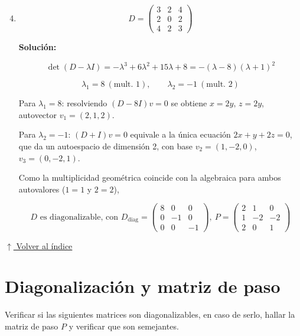 \documentclass[12pt]{article}
\newcommand{\solucion}{%
    \vspace{0.8em}%
    \textbf{Solución:}%
    \vspace{0.8em}%
}
\newcommand{\volverindice}{%
    \vspace{1em}%
    \begin{flushright}%
        \hyperlink{indice}{\small $\uparrow$ Volver al índice}%
    \end{flushright}%
}
\begin{document}
\begin{enumerate}[label=\alph*.-]
    \setcounter{enumi}{3}

    \item
    \[
    D=\begin{pmatrix}3&2&4\\2&0&2\\4&2&3\end{pmatrix}
    \]

    \solucion

    \[
    \det(D-\lambda I)=-\lambda^3+6\lambda^2+15\lambda+8
    =-(\lambda-8)(\lambda+1)^2
    \]

    \[
    \boxed{\lambda_1=8 \ (\text{mult. } 1), \qquad \lambda_2=-1\ (\text{mult. } 2)}
    \]

    Para $\lambda_1=8$: resolviendo $(D-8I)v=0$ se obtiene
    $x=2y,\, z=2y$, autovector $v_1=(2,1,2)$.

    Para $\lambda_2=-1$: $(D+I)v=0$ equivale a la única ecuación
    $2x+y+2z=0$, que da un autoespacio de dimensión 2, con base
    $v_2=(1,-2,0)$, $v_3=(0,-2,1)$.

    Como la multiplicidad geométrica coincide con la algebraica para
    ambos autovalores ($1=1$ y $2=2$),

    \[
    \boxed{
    D \text{ es diagonalizable, con } D_{\text{diag}}=\begin{pmatrix}8&0&0\\0&-1&0\\0&0&-1\end{pmatrix},
    \ P=\begin{pmatrix}2&1&0\\1&-2&-2\\2&0&1\end{pmatrix}
    }
    \]

\end{enumerate}

\volverindice
\newpage


\section{Diagonalización y matriz de paso}

Verificar si las siguientes matrices son diagonalizables, en caso de
serlo, hallar la matriz de paso $P$ y verificar que son semejantes.
\end{document}
